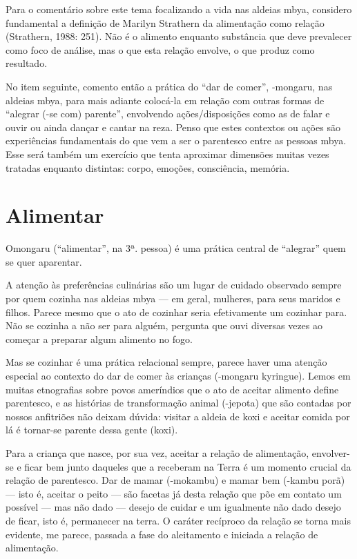 Para o comentário sobre este tema focalizando a vida nas aldeias mbya,
considero fundamental a definição de Marilyn Strathern da alimentação
como relação (Strathern, 1988: 251). Não é o alimento enquanto
substância que deve prevalecer como foco de análise, mas o que esta
relação envolve, o que produz como resultado.

No item seguinte, comento então a prática do ``dar de comer'', -mongaru,
nas aldeias mbya, para mais adiante colocá-la em relação com outras
formas de ``alegrar (-se com) parente'', envolvendo ações/disposições
como as de falar e ouvir ou ainda dançar e cantar na reza. Penso que
estes contextos ou ações são experiências fundamentais do que vem a ser
o parentesco entre as pessoas mbya. Esse será também um exercício que
tenta aproximar dimensões muitas vezes tratadas enquanto distintas:
corpo, emoções, consciência, memória.

\section{Alimentar}

Omongaru (``alimentar'', na 3ª. pessoa) é uma prática central de ``alegrar''
quem se quer aparentar.

A atenção às preferências culinárias são um lugar de cuidado observado
sempre por quem cozinha nas aldeias mbya --- em geral, mulheres, para
seus maridos e filhos. Parece mesmo que o ato de cozinhar seria
efetivamente um cozinhar para. Não se cozinha a não ser para alguém,
pergunta que ouvi diversas vezes ao começar a preparar algum alimento
no fogo. 

Mas se cozinhar é uma prática relacional sempre, parece haver uma
atenção especial ao contexto do dar de comer às crianças (-mongaru
kyringue). Lemos em muitas etnografias sobre povos ameríndios que o ato
de aceitar alimento define parentesco, e as histórias de transformação
animal (-jepota) que são contadas por nossos anfitriões não deixam
dúvida: visitar a aldeia de koxi e aceitar comida por lá é tornar-se
parente dessa gente (koxi).

Para a criança que nasce, por sua vez, aceitar a relação de alimentação,
envolver-se e ficar bem junto daqueles que a receberam na Terra é um
momento crucial da relação de parentesco. Dar de mamar (-mokambu) e
mamar bem (-kambu porã) --- isto é, aceitar o peito --- são facetas já
desta relação que põe em contato um possível --- mas não dado --- desejo de
cuidar e um igualmente não dado desejo de ficar, isto é, permanecer na
terra. O caráter recíproco da relação se torna mais evidente, me
parece, passada a fase do aleitamento e iniciada a relação de
alimentação.

